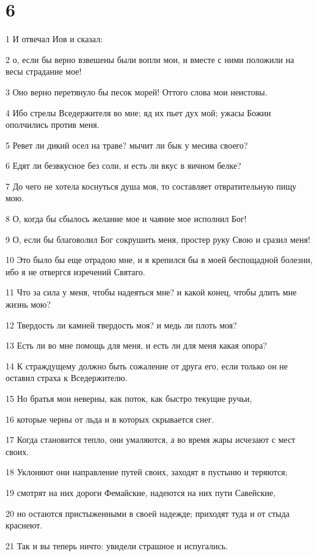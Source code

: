 \chapter{6}

\par 1 И отвечал Иов и сказал:
\par 2 о, если бы верно взвешены были вопли мои, и вместе с ними положили на весы страдание мое!
\par 3 Оно верно перетянуло бы песок морей! Оттого слова мои неистовы.
\par 4 Ибо стрелы Вседержителя во мне; яд их пьет дух мой; ужасы Божии ополчились против меня.
\par 5 Ревет ли дикий осел на траве? мычит ли бык у месива своего?
\par 6 Едят ли безвкусное без соли, и есть ли вкус в яичном белке?
\par 7 До чего не хотела коснуться душа моя, то составляет отвратительную пищу мою.
\par 8 О, когда бы сбылось желание мое и чаяние мое исполнил Бог!
\par 9 О, если бы благоволил Бог сокрушить меня, простер руку Свою и сразил меня!
\par 10 Это было бы еще отрадою мне, и я крепился бы в моей беспощадной болезни, ибо я не отвергся изречений Святаго.
\par 11 Что за сила у меня, чтобы надеяться мне? и какой конец, чтобы длить мне жизнь мою?
\par 12 Твердость ли камней твердость моя? и медь ли плоть моя?
\par 13 Есть ли во мне помощь для меня, и есть ли для меня какая опора?
\par 14 К страждущему должно быть сожаление от друга его, если только он не оставил страха к Вседержителю.
\par 15 Но братья мои неверны, как поток, как быстро текущие ручьи,
\par 16 которые черны от льда и в которых скрывается снег.
\par 17 Когда становится тепло, они умаляются, а во время жары исчезают с мест своих.
\par 18 Уклоняют они направление путей своих, заходят в пустыню и теряются;
\par 19 смотрят на них дороги Фемайские, надеются на них пути Савейские,
\par 20 но остаются пристыженными в своей надежде; приходят туда и от стыда краснеют.
\par 21 Так и вы теперь ничто: увидели страшное и испугались.
